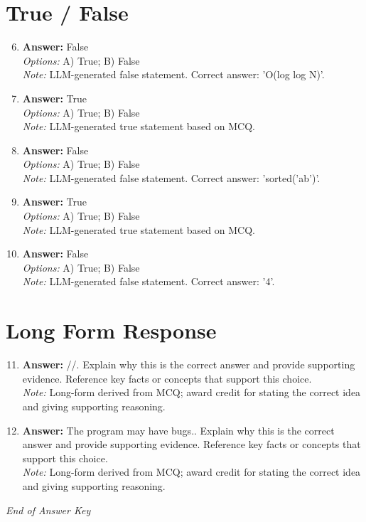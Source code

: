 \documentclass[12pt]{article}
\begin{document}
\section*{True / False}
\begin{enumerate}[label=\arabic*.]
\setcounter{enumi}{5}
\item \textbf{Answer:} False
\\ \textit{Options:} A) True; B) False
\\ \textit{Note:} LLM-generated false statement. Correct answer: 'O(log log N)'.
\item \textbf{Answer:} True
\\ \textit{Options:} A) True; B) False
\\ \textit{Note:} LLM-generated true statement based on MCQ.
\item \textbf{Answer:} False
\\ \textit{Options:} A) True; B) False
\\ \textit{Note:} LLM-generated false statement. Correct answer: 'sorted('ab')'.
\item \textbf{Answer:} True
\\ \textit{Options:} A) True; B) False
\\ \textit{Note:} LLM-generated true statement based on MCQ.
\item \textbf{Answer:} False
\\ \textit{Options:} A) True; B) False
\\ \textit{Note:} LLM-generated false statement. Correct answer: '4'.
\end{enumerate}

\section*{Long Form Response}
\begin{enumerate}[label=\arabic*.]
\setcounter{enumi}{10}
\item \textbf{Answer:} //. Explain why this is the correct answer and provide supporting evidence. Reference key facts or concepts that support this choice.
\\ \textit{Note:} Long-form derived from MCQ; award credit for stating the correct idea and giving supporting reasoning.
\item \textbf{Answer:} The program may have bugs.. Explain why this is the correct answer and provide supporting evidence. Reference key facts or concepts that support this choice.
\\ \textit{Note:} Long-form derived from MCQ; award credit for stating the correct idea and giving supporting reasoning.
\end{enumerate}

\vfill
\noindent\textit{End of Answer Key}
\end{document}
